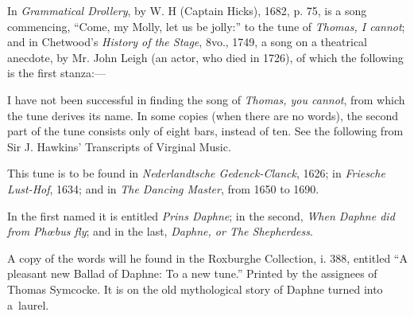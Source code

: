 In \textit{Grammatical Drollery}, by W. H (Captain Hicks), 1682, p. 75, is a song
commencing, “Come, my Molly, let us be jolly:” to the tune of \textit{Thomas,
I cannot}; and in Chetwood’s \textit{History of the Stage}, 8vo., 1749, a song on a
theatrical anecdote, by Mr. John Leigh (an actor, who died in 1726), of which
the following is the first stanza:—
\pagebreak



I have not been successful in finding the song of \textit{Thomas, you cannot}, from
which the tune derives its name. In some copies (when there are no words), the
second part of the tune consists only of eight bars, instead of ten. See the
following from Sir J. Hawkins’ Transcripts of Virginal Music.



\pagebreak


This tune is to be found in \textit{Nederlandtsche Gedenck-Clanck}, 1626; in\textit{ Friesche
Lust-Hof}, 1634; and in \textit{The Dancing Master}, from 1650 to 1690.

In the first named it is entitled \textit{Prins Daphne}; in the second,\textit{ When Daphne
did from Phœbus fly}; and in the last, \textit{Daphne, or The Shepherdess}.

A copy of the words will he found in the Roxburghe Collection, i. 388, entitled
“A pleasant new Ballad of Daphne: To a new tune.” Printed by the assignees
of Thomas Symcocke. It is on the old mythological story of Daphne turned into
a~laurel.



\pagebreak